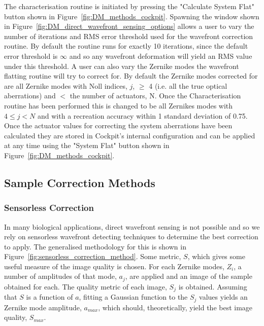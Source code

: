 The characterisation routine is initiated by pressing the "Calculate System Flat" button shown in Figure~\ref{fig:DM_methods_cockpit}. Spawning the window shown in Figure~\ref{fig:DM_direct_wavefront_sensing_options} allows a user to vary the number of iterations and RMS error threshold used for the wavefront correction routine. By default the routine runs for exactly 10 iterations, since the default error threshold is $\infty$ and so any wavefront deformation will yield an RMS value under this threshold. A user can also vary the Zernike modes the wavefront flatting routine will try to correct for. By default the Zernike modes corrected for are all Zernike modes with Noll indices, $j$, $\ge$ 4 (i.e. all the true optical aberrations) and $<$ the number of actuators, N. Once the Characterisation routine has been performed this is changed to be all Zernikes modes with $4 \le j < N$ and with a recreation accuracy within 1 standard deviation of 0.75.  Once the actuator values for correcting the system aberrations have been calculated they are stored in Cockpit's internal configuration and can be applied at any time using the "System Flat" button shown in Figure~\ref{fig:DM_methods_cockpit}.

\subsection{Sample Correction Methods}
\label{subsec:sample_correction_methods}

\subsubsection{Sensorless Correction}
\label{subsubsec:sensorless_correction}

In many biological applications, direct wavefront sensing is not possible and so we rely on sensorless wavefront detecting techniques to determine the best correction to apply. The generalised methodology for this is shown in Figure~\ref{fig:sensorless_correction_method}. Some metric, $S$, which gives some useful measure of the image quality is chosen. For each Zernike modes, $Z_{i}$, a number of amplitudes of that mode, $a_{j}$, are applied and an image of the sample obtained for each. The quality metric of each image, $S_{j}$ is obtained. Assuming that $S$ is a function of $a$, fitting a Gaussian function to the $S_{j}$ values yields an Zernike mode amplitude, $a_{max}$, which should, theoretically, yield the best image quality, $S_{max}$. 

